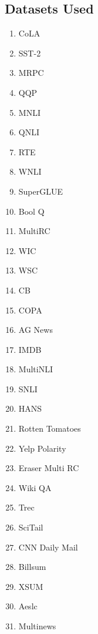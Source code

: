 \documentclass[11pt,a4paper]{article}
\begin{document}
\subsection{Datasets Used}
\begin{enumerate}
    \item CoLA \cite{cola}
    \item SST-2 \cite{sst2}
    \item MRPC \cite{mrpc}
    \item QQP \cite{qqp}
    \item MNLI \cite{mnli}
    \item QNLI \cite{qnli}
    \item RTE \cite{rte}
    \item WNLI \cite{winograd}
    \item SuperGLUE \cite{wang2019superglue}
    \item Bool Q \cite{clark2019boolq}
    \item MultiRC \cite{khashabi2018looking}
    \item WIC \cite{pilehvar2018wic}
    \item WSC \cite{levesque2011winograd}
    \item CB \cite{demarneffe:cb}
    \item COPA \cite {roemmele2011choice}
    \item AG News \cite{Zhang2015CharacterlevelCN}
    \item IMDB \cite{IMDB}
    \item MultiNLI \cite{MultiNLI}
    \item SNLI \cite{snli:emnlp2015}
    \item HANS \cite{HANS}
    \item Rotten Tomatoes \cite{RottenTomatoes}
    \item Yelp Polarity \cite{yelp_polarity}
    \item Eraser Multi RC \cite{eraser}
    \item Wiki QA \cite{WikiQA}
    \item Trec  \cite{li-roth-2002-learning, hovy-etal-2001-toward}
    \item SciTail \cite{scitail}
    \item CNN Daily Mail \cite{cnndailymail}
    \item Billsum \cite{billsum}
    \item XSUM \cite{xsum}
    \item Aeslc \cite{aelsc}
    \item Multinews \cite{multinews}

\end{enumerate}
\end{document}
